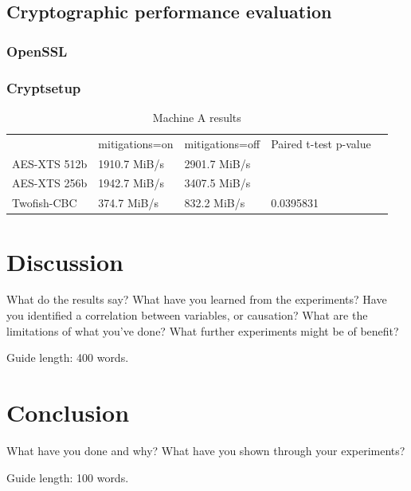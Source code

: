 \documentclass{csfourzero}
\begin{document}
\subsection{Cryptographic performance evaluation}

\subsubsection{OpenSSL}

\subsubsection{Cryptsetup}
\begin{table}[h]
\centering
\begin{tabular}{|l|l|l|l|l}
\cline{1-4}
             & mitigations=on & mitigations=off & Paired t-test p-value &  \\ \cline{1-4}
AES-XTS 512b & 1910.7 MiB/s   & 2901.7 MiB/s    &         &  \\ \cline{1-4}
AES-XTS 256b & 1942.7 MiB/s   & 3407.5 MiB/s    &         &  \\ \cline{1-4}
Twofish-CBC  & 374.7 MiB/s    & 832.2 MiB/s     & 0.0395831 &  \\ \cline{1-4}
\end{tabular}
\caption{Machine A results }
\label{tab:cryptoa}
\end{table}

\section{Discussion}
\label{sec:discuss}

What do the results say? What have you learned from the
experiments? Have you identified a correlation between variables, or
causation? What are the limitations of what you've done? What further
experiments might be of benefit?

Guide length: 400 words.

\section{Conclusion}
\label{sec:conc}

What have you done and why? What have you shown through your
experiments?

Guide length: 100 words.


\end{document}
